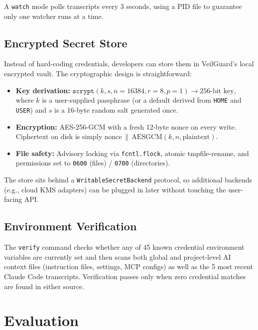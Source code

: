\documentclass[conference]{IEEEtran}
\begin{document}
A \texttt{watch} mode polls transcripts every 3 seconds, using a PID file to
guarantee only one watcher runs at a time.

\subsection{Encrypted Secret Store}
\label{sec:store}

Instead of hard-coding credentials, developers can store them in VeilGuard's
local encrypted vault. The cryptographic design is straightforward:

\begin{itemize}
  \item \textbf{Key derivation:}
        $\texttt{scrypt}(k, s, n{=}16384, r{=}8, p{=}1) \rightarrow 256\text{-bit key}$,
        where $k$ is a user-supplied passphrase (or a default derived from
        \texttt{HOME} and \texttt{USER}) and $s$ is a 16-byte random salt
        generated once.
  \item \textbf{Encryption:} AES-256-GCM with a fresh 12-byte nonce on every
        write. Ciphertext on disk is simply
        $\text{nonce} \,\|\, \text{AESGCM}(k, n, \text{plaintext})$.
  \item \textbf{File safety:} Advisory locking via \texttt{fcntl.flock},
        atomic tmpfile-rename, and permissions set to \texttt{0600}
        (files) / \texttt{0700} (directories).
\end{itemize}

The store sits behind a \texttt{WritableSecretBackend} protocol, so additional
backends (e.g., cloud KMS adapters) can be plugged in later without touching
the user-facing API.

\subsection{Environment Verification}
\label{sec:verify}

The \texttt{verify} command checks whether any of 45 known credential
environment variables are currently set and then scans both global and
project-level AI context files (instruction files, settings, MCP configs) as
well as the 5 most recent Claude Code transcripts. Verification passes only
when zero credential matches are found in either source.


\section{Evaluation}
\label{sec:eval}
\end{document}
